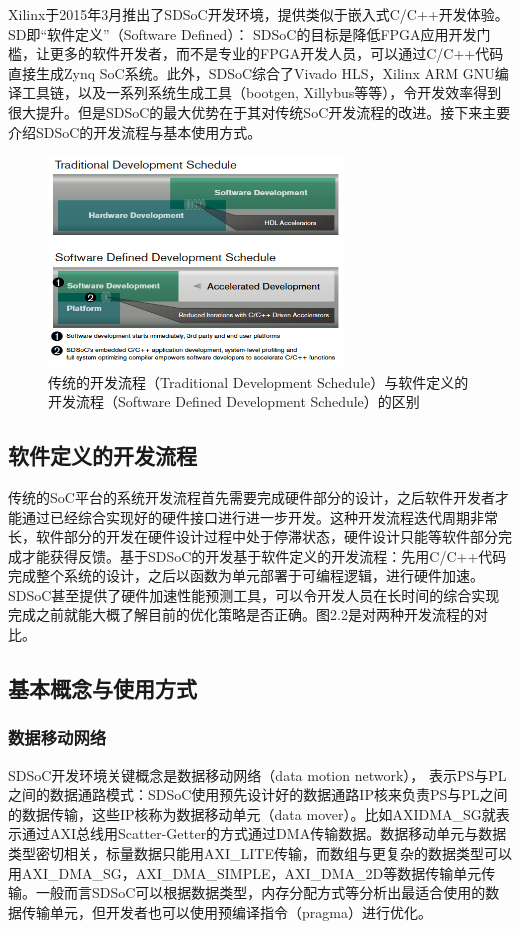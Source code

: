 Xilinx于2015年3月推出了SDSoC开发环境，提供类似于嵌入式C/C++开发体验。SD即“软件定义”（Software Defined）\supercite{sdsoc}：
SDSoC的目标是降低FPGA应用开发门槛，让更多的软件开发者，而不是专业的FPGA开发人员，可以通过C/C++代码直接生成Zynq SoC系统。此外，SDSoC综合了Vivado HLS，Xilinx ARM GNU编译工具链，以及一系列系统生成工具（bootgen, Xillybus等等），令开发效率得到很大提升。但是SDSoC的最大优势在于其对传统SoC开发流程的改进。接下来主要介绍SDSoC的开发流程与基本使用方式。

\begin{figure}[!ht]
\centering
	\includegraphics[width=0.7\textwidth]{assets/imgs/software-defined}
\caption{传统的开发流程（Traditional Development Schedule）与软件定义的开发流程（Software Defined Development Schedule）的区别}
\end{figure}

\subsection{软件定义的开发流程}

传统的SoC平台的系统开发流程首先需要完成硬件部分的设计，之后软件开发者才能通过已经综合实现好的硬件接口进行进一步开发。这种开发流程迭代周期非常长，软件部分的开发在硬件设计过程中处于停滞状态，硬件设计只能等软件部分完成才能获得反馈。基于SDSoC的开发基于软件定义的开发流程：先用C/C++代码完成整个系统的设计，之后以函数为单元部署于可编程逻辑，进行硬件加速。SDSoC甚至提供了硬件加速性能预测工具，可以令开发人员在长时间的综合实现完成之前就能大概了解目前的优化策略是否正确。图2.2是对两种开发流程的对比。

\subsection{基本概念与使用方式}

\subsubsection{数据移动网络}
SDSoC开发环境关键概念是数据移动网络（data motion network）\supercite{ug1027}，
表示PS与PL之间的数据通路模式：SDSoC使用预先设计好的数据通路IP核来负责PS与PL之间的数据传输，这些IP核称为数据移动单元（data mover）。比如AXIDMA\_SG就表示通过AXI总线用Scatter-Getter的方式通过DMA传输数据。数据移动单元与数据类型密切相关，标量数据只能用AXI\_LITE传输，而数组与更复杂的数据类型可以用AXI\_DMA\_SG，AXI\_DMA\_SIMPLE，AXI\_DMA\_2D等数据传输单元传输。一般而言SDSoC可以根据数据类型，内存分配方式等分析出最适合使用的数据传输单元，但开发者也可以使用预编译指令（pragma）进行优化。

